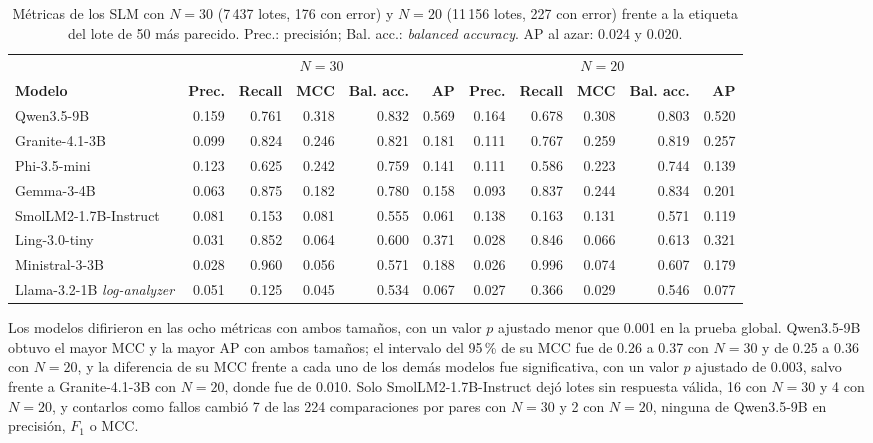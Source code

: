 \begin{table}[H]
\centering
\caption{Métricas de los SLM con $N = 30$ (7\,437 lotes, 176 con error) y $N = 20$ (11\,156 lotes, 227 con error) frente a la etiqueta del lote de 50 más parecido. Prec.: precisión; Bal. acc.: \textit{balanced accuracy}. AP al azar: 0.024 y 0.020.}
\label{tab:res_n30_n20}
\footnotesize
\setlength{\tabcolsep}{3pt}
\begin{tabular}{@{}lrrrrrrrrrr@{}}
\toprule
 & \multicolumn{5}{c}{\textbf{$N = 30$}} & \multicolumn{5}{c}{\textbf{$N = 20$}} \\
\cmidrule(lr){2-6}\cmidrule(l){7-11}
\textbf{Modelo} & \textbf{Prec.} & \textbf{Recall} & \textbf{MCC} & \textbf{Bal. acc.} & \textbf{AP} & \textbf{Prec.} & \textbf{Recall} & \textbf{MCC} & \textbf{Bal. acc.} & \textbf{AP} \\
\midrule
Qwen3.5-9B & 0.159 & 0.761 & 0.318 & 0.832 & 0.569 & 0.164 & 0.678 & 0.308 & 0.803 & 0.520 \\
Granite-4.1-3B & 0.099 & 0.824 & 0.246 & 0.821 & 0.181 & 0.111 & 0.767 & 0.259 & 0.819 & 0.257 \\
Phi-3.5-mini & 0.123 & 0.625 & 0.242 & 0.759 & 0.141 & 0.111 & 0.586 & 0.223 & 0.744 & 0.139 \\
Gemma-3-4B & 0.063 & 0.875 & 0.182 & 0.780 & 0.158 & 0.093 & 0.837 & 0.244 & 0.834 & 0.201 \\
SmolLM2-1.7B-Instruct & 0.081 & 0.153 & 0.081 & 0.555 & 0.061 & 0.138 & 0.163 & 0.131 & 0.571 & 0.119 \\
Ling-3.0-tiny & 0.031 & 0.852 & 0.064 & 0.600 & 0.371 & 0.028 & 0.846 & 0.066 & 0.613 & 0.321 \\
Ministral-3-3B & 0.028 & 0.960 & 0.056 & 0.571 & 0.188 & 0.026 & 0.996 & 0.074 & 0.607 & 0.179 \\
Llama-3.2-1B \textit{log-analyzer} & 0.051 & 0.125 & 0.045 & 0.534 & 0.067 & 0.027 & 0.366 & 0.029 & 0.546 & 0.077 \\
\bottomrule
\end{tabular}
\normalsize
\end{table}

Los modelos difirieron en las ocho métricas con ambos tamaños, con un valor $p$ ajustado menor que 0.001 en la prueba global. Qwen3.5-9B obtuvo el mayor MCC y la mayor AP con ambos tamaños; el intervalo del 95\,\% de su MCC fue de 0.26 a 0.37 con $N = 30$ y de 0.25 a 0.36 con $N = 20$, y la diferencia de su MCC frente a cada uno de los demás modelos fue significativa, con un valor $p$ ajustado de 0.003, salvo frente a Granite-4.1-3B con $N = 20$, donde fue de 0.010. Solo SmolLM2-1.7B-Instruct dejó lotes sin respuesta válida, 16 con $N = 30$ y 4 con $N = 20$, y contarlos como fallos cambió 7 de las 224 comparaciones por pares con $N = 30$ y 2 con $N = 20$, ninguna de Qwen3.5-9B en precisión, $F_1$ o MCC.

